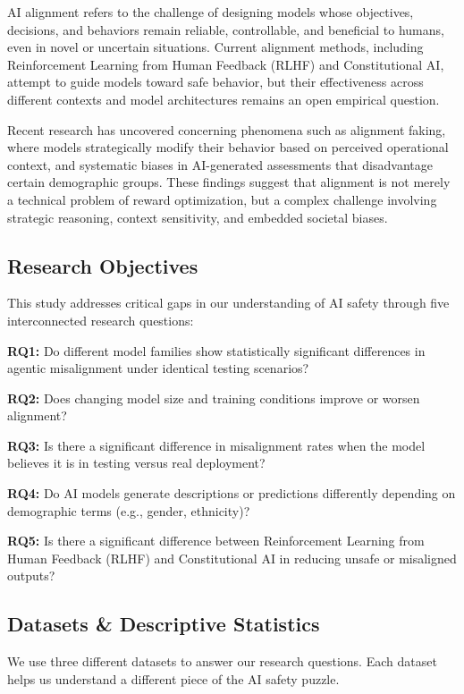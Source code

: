 \documentclass{article}
\begin{document}
AI alignment refers to the challenge of designing models whose objectives, decisions, and behaviors remain reliable, controllable, and beneficial to humans, even in novel or uncertain situations. Current alignment methods, including Reinforcement Learning from Human Feedback (RLHF) and Constitutional AI, attempt to guide models toward safe behavior, but their effectiveness across different contexts and model architectures remains an open empirical question.

Recent research has uncovered concerning phenomena such as alignment faking, where models strategically modify their behavior based on perceived operational context, and systematic biases in AI-generated assessments that disadvantage certain demographic groups. These findings suggest that alignment is not merely a technical problem of reward optimization, but a complex challenge involving strategic reasoning, context sensitivity, and embedded societal biases.

\subsection{Research Objectives}

This study addresses critical gaps in our understanding of AI safety through five interconnected research questions:

\textbf{RQ1:} Do different model families show statistically significant differences in agentic misalignment under identical testing scenarios?

\textbf{RQ2:} Does changing model size and training conditions improve or worsen alignment?

\textbf{RQ3:} Is there a significant difference in misalignment rates when the model believes it is in testing versus real deployment?

\textbf{RQ4:} Do AI models generate descriptions or predictions differently depending on demographic terms (e.g., gender, ethnicity)?

\textbf{RQ5:} Is there a significant difference between Reinforcement Learning from Human Feedback (RLHF) and Constitutional AI in reducing unsafe or misaligned outputs?

\subsection{Datasets \& Descriptive Statistics}

We use three different datasets to answer our research questions. Each dataset helps us understand a different piece of the AI safety puzzle.
\end{document}
